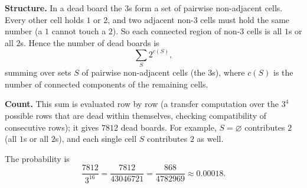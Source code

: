 \textbf{Structure.} In a dead board the $3$s form a set of pairwise non-adjacent cells. Every other cell holds $1$ or $2$, and two adjacent non-$3$ cells must hold the same number (a $1$ cannot touch a $2$). So each connected region of non-$3$ cells is all $1$s or all $2$s. Hence the number of dead boards is
\[
\sum_{S}2^{c(S)},
\]
summing over sets $S$ of pairwise non-adjacent cells (the $3$s), where $c(S)$ is the number of connected components of the remaining cells.

\textbf{Count.} This sum is evaluated row by row (a transfer computation over the $3^4$ possible rows that are dead within themselves, checking compatibility of consecutive rows); it gives $7812$ dead boards. For example, $S=\varnothing$ contributes $2$ (all $1$s or all $2$s), and each single cell $S$ contributes $2$ as well.

The probability is
\[
\dfrac{7812}{3^{16}}=\dfrac{7812}{43046721}=\boxed{\dfrac{868}{4782969}}\approx0.00018 .
\]
